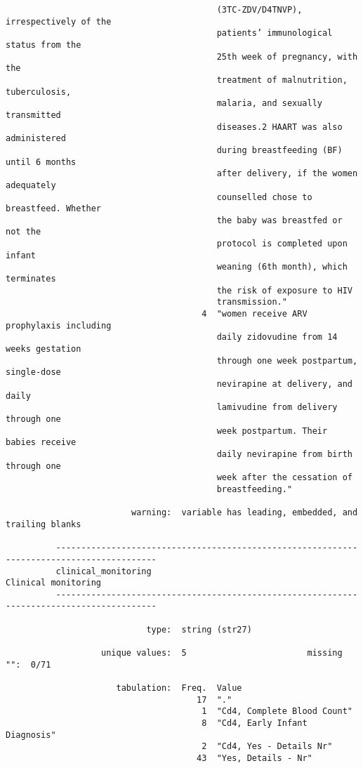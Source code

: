 \documentclass{article}
\begin{document}
\begin{verbatim}
                                          (3TC-ZDV/D4TNVP), irrespectively of the
                                          patients’ immunological status from the
                                          25th week of pregnancy, with the
                                          treatment of malnutrition, tuberculosis,
                                          malaria, and sexually transmitted
                                          diseases.2 HAART was also administered
                                          during breastfeeding (BF) until 6 months
                                          after delivery, if the women adequately
                                          counselled chose to breastfeed. Whether
                                          the baby was breastfed or not the
                                          protocol is completed upon infant
                                          weaning (6th month), which terminates
                                          the risk of exposure to HIV
                                          transmission."
                                       4  "women receive ARV prophylaxis including
                                          daily zidovudine from 14 weeks gestation
                                          through one week postpartum, single-dose
                                          nevirapine at delivery, and daily
                                          lamivudine from delivery through one
                                          week postpartum. Their babies receive
                                          daily nevirapine from birth through one
                                          week after the cessation of
                                          breastfeeding."
          
                         warning:  variable has leading, embedded, and trailing blanks
          
          ------------------------------------------------------------------------------------------
          clinical_monitoring                                                    Clinical monitoring
          ------------------------------------------------------------------------------------------
          
                            type:  string (str27)
          
                   unique values:  5                        missing "":  0/71
          
                      tabulation:  Freq.  Value
                                      17  "."
                                       1  "Cd4, Complete Blood Count"
                                       8  "Cd4, Early Infant Diagnosis"
                                       2  "Cd4, Yes - Details Nr"
                                      43  "Yes, Details - Nr"
          

\end{verbatim}
\end{document}
